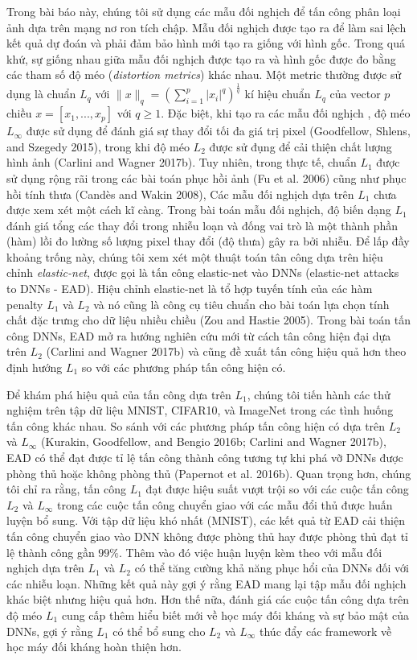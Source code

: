 Trong bài báo này, chúng tôi sử dụng các mẫu đối nghịch để tấn công phân loại ảnh dựa trên 
mạng nơ ron tích chập. Mẫu đối nghịch được tạo ra để làm sai lệch kết quả dự đoán và phải đảm bảo
hình mới tạo ra giống với hình gốc. Trong quá khứ, sự giống nhau giữa mẫu đối nghịch được tạo
ra và hình gốc được đo bằng các tham số độ méo (\textit{distortion metrics}) khác nhau.
Một metric thường được sử dụng là chuẩn $L_q$ 
với $\lVert x \rVert_q = \left( \sum_{i=1}^p |x_i|^q \right)^{\frac{1}{q}}$ kí hiệu chuẩn $L_q$
của vector $p$ chiều $x = [x_1, ..., x_p]$ với $q \geq 1$. Đặc biệt, khi tạo ra các mẫu đối nghịch
, độ méo $L_{\infty}$ được sử dụng để đánh giá sự thay đổi tối đa giá trị pixel (Goodfellow, 
Shlens, and Szegedy 2015), trong khi độ méo $L_2$ được sử đụng để cải thiện chất lượng hình 
ảnh (Carlini and Wagner 2017b). Tuy nhiên, trong thực tế, chuẩn $L_1$ được sử dụng rộng rãi 
trong các bài toán phục hồi ảnh (Fu et al. 2006) cũng như phục hồi tính thưa (Candès and Wakin 2008),
Các mẫu đối nghịch dựa trên $L_1$ chưa được xem xét một cách kĩ càng. Trong bài toán mẫu đối nghịch,
độ biến dạng $L_1$ đánh giá tổng các thay đổi trong nhiễu loạn và đống vai trò là một thành phần
(hàm) lồi đo lường số lượng pixel thay đổi (độ thưa) gây ra bởi nhiễu. Để lấp đầy khoảng trống
này, chúng tôi xem xét một thuật toán tân công dựa trên hiệu chỉnh \textit{elastic-net}, được 
gọi là tấn công elastic-net vào DNNs (elastic-net attacks to DNNs - EAD). Hiệu chỉnh 
elastic-net là tổ hợp tuyến tính của các hàm penalty $L_1$ và $L_2$ và nó cũng là công cụ 
tiêu chuẩn cho bài toán lựa chọn tính chất đặc trưng cho dữ liệu nhiều chiều (Zou and Hastie 2005). 
Trong bài toán tấn công DNNs, EAD mở ra hướng nghiên cứu mới từ cách tân công hiện đại dựa trên 
$L_2$ (Carlini and Wagner 2017b) và cũng đề xuất tấn công hiệu quả hơn theo định hướng $L_1$
so với các phương pháp tấn công hiện có. 

Để khám phá hiệu quả của tấn công dựa trên $L_1$, chúng tôi tiến hành các thử nghiệm trên tập 
dữ liệu MNIST, CIFAR10, và ImageNet trong các tình huống tấn công khác nhau. So sánh với các 
phương pháp tấn công hiện có dựa trên $L_2$ và $L_{\infty}$ (Kurakin, Goodfellow, and 
Bengio 2016b; Carlini and Wagner 2017b), EAD có thể đạt được tỉ lệ tấn công thành công tương 
tự khi phá vỡ DNNs được phòng thủ hoặc không phòng thủ (Papernot et al. 2016b). Quan trọng 
hơn, chúng tôi chỉ ra rằng, tấn công $L_1$ đạt được hiệu suất vượt trội so với các cuộc tấn
công $L_2$ và $L_{\infty}$ trong các cuộc tấn công chuyển giao với các mẫu đổi thủ được huấn
luyện bổ sung. Với tập dữ liệu khó nhất (MNIST), các kết quả từ EAD cải thiện tấn công chuyển 
giao vào DNN không được phòng thủ hay được phòng thủ đạt tỉ lệ thành công gần $99\%$. Thêm vào 
đó việc huận luyện kèm theo với mẫu đối nghịch dựa trên $L_1$ và $L_2$ có thể tăng cường khả 
năng phục hổi của DNNs đối với các nhiễu loạn. Những kết quả này gợi ý rằng EAD mang lại tập 
mẫu đối nghịch khác biệt nhưng hiệu quả hơn. Hơn thế nữa, đánh giá các cuộc tấn công dựa trên 
độ méo $L_1$ cung cấp thêm hiểu biết mới về học máy đối kháng và sự bảo mật của DNNs, gợi 
ý rằng $L_1$ có thể bổ sung cho $L_2$ và $L_{\infty}$ thúc đẩy các framework về học máy đối 
kháng hoàn thiện hơn.
